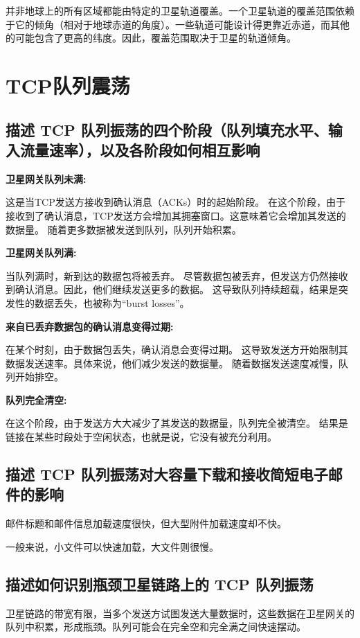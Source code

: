 并非地球上的所有区域都能由特定的卫星轨道覆盖。一个卫星轨道的覆盖范围依赖于它的倾角（相对于地球赤道的角度）。一些轨道可能设计得更靠近赤道，而其他的可能包含了更高的纬度。因此，覆盖范围取决于卫星的轨道倾角。

\section{TCP队列震荡}

\subsection{描述 TCP 队列振荡的四个阶段（队列填充水平、输入流量速率），以及各阶段如何相互影响}

\textbf{卫星网关队列未满:}

这是当TCP发送方接收到确认消息（ACKs）时的起始阶段。
在这个阶段，由于接收到了确认消息，TCP发送方会增加其拥塞窗口。这意味着它会增加其发送的数据量。
随着更多数据被发送到队列，队列开始积累。

\textbf{卫星网关队列满:}

当队列满时，新到达的数据包将被丢弃。
尽管数据包被丢弃，但发送方仍然接收到确认消息。因此，他们继续发送更多的数据。
这导致队列持续超载，结果是突发性的数据丢失，也被称为“burst losses”。

\textbf{来自已丢弃数据包的确认消息变得过期:}

在某个时刻，由于数据包丢失，确认消息会变得过期。
这导致发送方开始限制其数据发送速率。具体来说，他们减少发送的数据量。
随着数据发送速度减慢，队列开始排空。

\textbf{队列完全清空:}

在这个阶段，由于发送方大大减少了其发送的数据量，队列完全被清空。
结果是链接在某些时段处于空闲状态，也就是说，它没有被充分利用。

\subsection{描述 TCP 队列振荡对大容量下载和接收简短电子邮件的影响}

邮件标题和邮件信息加载速度很快，但大型附件加载速度却不快。

一般来说，小文件可以快速加载，大文件则很慢。

\subsection{描述如何识别瓶颈卫星链路上的 TCP 队列振荡}

卫星链路的带宽有限，当多个发送方试图发送大量数据时，这些数据在卫星网关的队列中积累，形成瓶颈。队列可能会在完全空和完全满之间快速摆动。

